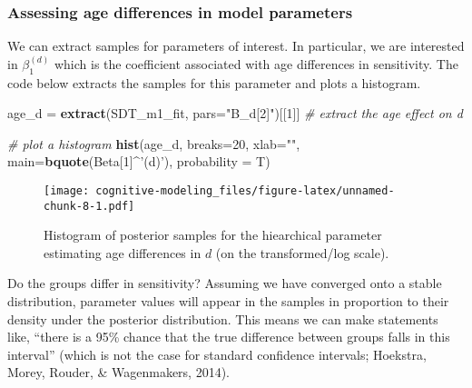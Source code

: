 \documentclass[
  english,
  ,man,floatsintext]{apa6}
\newenvironment{Shaded}{\begin{snugshade}}{\end{snugshade}}
\newcommand{\CommentTok}[1]{\textcolor[rgb]{0.56,0.35,0.01}{\textit{#1}}}
\newcommand{\DataTypeTok}[1]{\textcolor[rgb]{0.13,0.29,0.53}{#1}}
\newcommand{\DecValTok}[1]{\textcolor[rgb]{0.00,0.00,0.81}{#1}}
\newcommand{\KeywordTok}[1]{\textcolor[rgb]{0.13,0.29,0.53}{\textbf{#1}}}
\newcommand{\NormalTok}[1]{#1}
\newcommand{\OperatorTok}[1]{\textcolor[rgb]{0.81,0.36,0.00}{\textbf{#1}}}
\newcommand{\StringTok}[1]{\textcolor[rgb]{0.31,0.60,0.02}{#1}}
\begin{document}
\hypertarget{assessing-age-differences-in-model-parameters}{%
\subsubsection{Assessing age differences in model parameters}\label{assessing-age-differences-in-model-parameters}}

We can extract samples for parameters of interest. In particular, we are interested in \(\beta^{(d)}_1\) which is the coefficient associated with age differences in sensitivity. The code below extracts the samples for this parameter and plots a histogram.

\begin{Shaded}
\begin{Highlighting}[]
\NormalTok{age_d =}\StringTok{ }\KeywordTok{extract}\NormalTok{(SDT_m1_fit, }\DataTypeTok{pars=}\StringTok{"B_d[2]"}\NormalTok{)[[}\DecValTok{1}\NormalTok{]] }\CommentTok{# extract the age effect on d}
\end{Highlighting}
\end{Shaded}

\begin{Shaded}
\begin{Highlighting}[]
\CommentTok{# plot a histogram}
\KeywordTok{hist}\NormalTok{(age_d, }\DataTypeTok{breaks=}\DecValTok{20}\NormalTok{, }\DataTypeTok{xlab=}\StringTok{""}\NormalTok{, }\DataTypeTok{main=}\KeywordTok{bquote}\NormalTok{(Beta[}\DecValTok{1}\NormalTok{]}\OperatorTok{^}\StringTok{'(d)'}\NormalTok{), }\DataTypeTok{probability =}\NormalTok{ T)}
\end{Highlighting}
\end{Shaded}

\begin{figure}
\centering
\texttt{[image: cognitive-modeling\_files/figure-latex/unnamed-chunk-8-1.pdf]}
\caption{\label{fig:unnamed-chunk-8}Histogram of posterior samples for the hiearchical parameter estimating age differences in \(d\) (on the transformed/log scale).}
\end{figure}

Do the groups differ in sensitivity? Assuming we have converged onto a stable distribution, parameter values will appear in the samples in proportion to their density under the posterior distribution. This means we can make statements like, \enquote{there is a 95\% chance that the true difference between groups falls in this interval} (which is not the case for standard confidence intervals; Hoekstra, Morey, Rouder, \& Wagenmakers, 2014).
\end{document}
